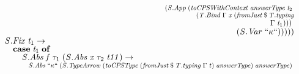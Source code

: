 \documentclass[10pt]{article}
\newcommand{\Conid}[1]{\mathit{#1}}
\newcommand{\Varid}[1]{\mathit{#1}}
\begin{document}
\begin{hscode}
${\hskip1.00em\relax\hskip1.00em\relax\phantom{\Conid{\Conid{S}.Let}\;\Varid{x}\;\Varid{t}_{1}\;\Varid{t}_{2}\to \Conid{\Conid{S}.Abs}\;\text{``}\kappa\text{``}\;\mbox{}}\phantom{(\Conid{\Conid{S}.App}\;\mbox{}}\phantom{(\Conid{\Conid{S}.Abs}\;\text{\tt \char34 v\char34}\;\mbox{}}\phantom{(\Conid{\Conid{S}.Let}\;\Varid{x}\;\mbox{}}(\Conid{\Conid{S}.App}\;(\Varid{toCPSWithContext}\;\Varid{answerType}\;\Varid{t}_{2}\;}$\\
${\hskip1.00em\relax\hskip1.00em\relax\phantom{\Conid{\Conid{S}.Let}\;\Varid{x}\;\Varid{t}_{1}\;\Varid{t}_{2}\to \Conid{\Conid{S}.Abs}\;\text{``}\kappa\text{``}\;\mbox{}}\phantom{(\Conid{\Conid{S}.App}\;\mbox{}}\phantom{(\Conid{\Conid{S}.Abs}\;\text{\tt \char34 v\char34}\;\mbox{}}\phantom{(\Conid{\Conid{S}.Let}\;\Varid{x}\;\mbox{}}\hskip5.50em\relax(\Conid{\Conid{T}.Bind}\;\Gamma\;\Varid{x}\;(\Varid{fromJust}\mathbin{\$}\Varid{\Conid{T}.typing}}$\\
${\hskip1.00em\relax\hskip1.00em\relax\phantom{\Conid{\Conid{S}.Let}\;\Varid{x}\;\Varid{t}_{1}\;\Varid{t}_{2}\to \Conid{\Conid{S}.Abs}\;\text{``}\kappa\text{``}\;\mbox{}}\phantom{(\Conid{\Conid{S}.App}\;\mbox{}}\phantom{(\Conid{\Conid{S}.Abs}\;\text{\tt \char34 v\char34}\;\mbox{}}\phantom{(\Conid{\Conid{S}.Let}\;\Varid{x}\;\mbox{}}\hskip5.50em\relax\phantom{(\Conid{\Conid{T}.Bind}\;\Gamma\;\Varid{x}\;(\mbox{}}\Gamma\;\Varid{t}_{1})))\;}$\\
${\hskip1.00em\relax\hskip1.00em\relax\phantom{\Conid{\Conid{S}.Let}\;\Varid{x}\;\Varid{t}_{1}\;\Varid{t}_{2}\to \Conid{\Conid{S}.Abs}\;\text{``}\kappa\text{``}\;\mbox{}}\phantom{(\Conid{\Conid{S}.App}\;\mbox{}}\phantom{(\Conid{\Conid{S}.Abs}\;\text{\tt \char34 v\char34}\;\mbox{}}\phantom{(\Conid{\Conid{S}.Let}\;\Varid{x}\;\mbox{}}\phantom{(\Conid{\Conid{S}.App}\;\mbox{}}(\Conid{\Conid{S}.Var}\;\text{``}\kappa\text{``})))))}$\\
${\hskip1.00em\relax\hskip1.00em\relax\Conid{\Conid{S}.Fix}\;\Varid{t}_{1}\to }$\\
${\hskip1.00em\relax\hskip1.00em\relax\hskip1.00em\relax\mathbf{case}\;\Varid{t}_{1}\;\mathbf{of}}$\\
${\hskip1.00em\relax\hskip1.00em\relax\hskip1.00em\relax\hskip1.00em\relax\Conid{\Conid{S}.Abs}\;\Varid{f}\;\tau_{1}\;(\Conid{\Conid{S}.Abs}\;\Varid{x}\;\tau_{2}\;\Varid{t11})\to }$\\
${\hskip1.00em\relax\hskip1.00em\relax\hskip1.00em\relax\hskip1.00em\relax\hskip2.00em\relax\Conid{\Conid{S}.Abs}\;\text{``}\kappa\text{``}\;(\Conid{\Conid{S}.TypeArrow}\;(\Varid{toCPSType}\;(\Varid{fromJust}\mathbin{\$}\Varid{\Conid{T}.typing}\;\Gamma\;\Varid{t})\;\Varid{answerType})\;\Varid{answerType})\;}$\\

\end{hscode}
\end{document}
